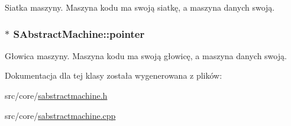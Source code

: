 Siatka maszyny. Maszyna kodu ma swoją siatkę, a maszyna danych swoją. \hypertarget{classSAbstractMachine_7fb67b2cf326fa3176570ca65c573c79}{
\subsubsection[{pointer}]{$\ast$ {\bf SAbstractMachine::pointer}}}
\label{classSAbstractMachine_7fb67b2cf326fa3176570ca65c573c79}


Głowica maszyny. Maszyna kodu ma swoją głowicę, a maszyna danych swoją. 

Dokumentacja dla tej klasy została wygenerowana z plików:\begin{CompactItemize}
\item 
src/core/\hyperlink{sabstractmachine_8h}{sabstractmachine.h}\item 
src/core/\hyperlink{sabstractmachine_8cpp}{sabstractmachine.cpp}\end{CompactItemize}

